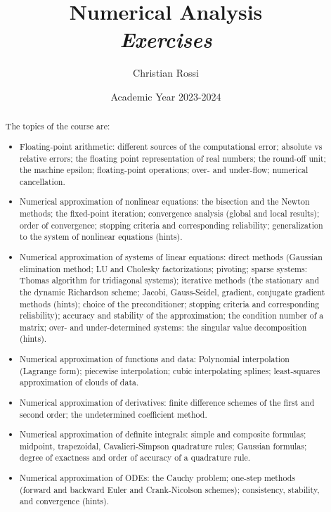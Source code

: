 \documentclass[12pt, a4paper]{report}
\title{Numerical Analysis\\ \textit{Exercises}}
\author{Christian Rossi}
\date{Academic Year 2023-2024}
\begin{document}
\maketitle

\newpage

\begin{abstract}
    The topics of the course are:
    \begin{itemize}
        \item Floating-point arithmetic: different sources of the computational error; absolute vs relative errors; the floating point representation 
            of real numbers; the round-off unit; the machine epsilon; floating-point operations; over- and under-flow; numerical cancellation.
        \item Numerical approximation of nonlinear equations: the bisection and the Newton methods; the fixed-point iteration; convergence analysis 
            (global and local results); order of convergence; stopping criteria and corresponding reliability; generalization to the system of 
            nonlinear equations (hints).
        \item Numerical approximation of systems of linear equations: direct methods (Gaussian elimination method; LU and Cholesky factorizations; 
            pivoting; sparse systems: Thomas algorithm for tridiagonal systems); iterative methods (the stationary and the dynamic Richardson scheme; 
            Jacobi, Gauss-Seidel, gradient, conjugate gradient methods (hints); choice of the preconditioner; stopping criteria and corresponding 
            reliability); accuracy and stability of the approximation; the condition number of a matrix; over- and under-determined systems: the 
            singular value decomposition (hints).
        \item Numerical approximation of functions and data: Polynomial interpolation (Lagrange form); piecewise interpolation; cubic interpolating 
            splines; least-squares approximation of clouds of data.
        \item Numerical approximation of derivatives: finite difference schemes of the first and second order; the undetermined coefficient method.
        \item Numerical approximation of definite integrals: simple and composite formulas; midpoint, trapezoidal, Cavalieri-Simpson quadrature rules; 
            Gaussian formulas; degree of exactness and order of accuracy of a quadrature rule. 
        \item Numerical approximation of ODEs: the Cauchy problem; one-step methods (forward and backward Euler and Crank-Nicolson schemes); 
            consistency, stability, and convergence (hints).
    \end{itemize}
\end{abstract}
\end{document}
